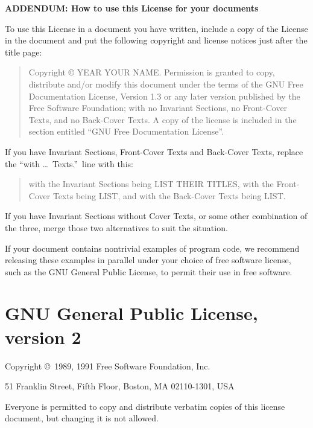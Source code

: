 \documentclass[a4paper,11pt]{book}
\begin{document}
\begin{center}
	{\Large\bf ADDENDUM: How to use this License for your documents\par}
\end{center}

To use this License in a document you have written, include a copy of
the License in the document and put the following copyright and
license notices just after the title page:

\bigskip
\begin{quote}
	Copyright \copyright{}  YEAR  YOUR NAME.
	Permission is granted to copy, distribute and/or modify this document
	under the terms of the GNU Free Documentation License, Version 1.3
	or any later version published by the Free Software Foundation;
	with no Invariant Sections, no Front-Cover Texts, and no Back-Cover Texts.
	A copy of the license is included in the section entitled ``GNU
	Free Documentation License''.
\end{quote}
\bigskip

If you have Invariant Sections, Front-Cover Texts and Back-Cover Texts,
replace the ``with \dots\ Texts.''\ line with this:

\bigskip
\begin{quote}
	with the Invariant Sections being LIST THEIR TITLES, with the
	Front-Cover Texts being LIST, and with the Back-Cover Texts being LIST.
\end{quote}
\bigskip

If you have Invariant Sections without Cover Texts, or some other
combination of the three, merge those two alternatives to suit the
situation.

If your document contains nontrivial examples of program code, we
recommend releasing these examples in parallel under your choice of
free software license, such as the GNU General Public License,
to permit their use in free software.

\chapter{GNU General Public License, version 2}

\begin{center}
	{\parindent 0in
		
		Copyright \copyright\ 1989, 1991 Free Software Foundation, Inc.
		
		\bigskip
		
		51 Franklin Street, Fifth Floor, Boston, MA  02110-1301, USA
		
		\bigskip
		
		Everyone is permitted to copy and distribute verbatim copies
		of this license document, but changing it is not allowed.
	}
\end{center}
\end{document}
